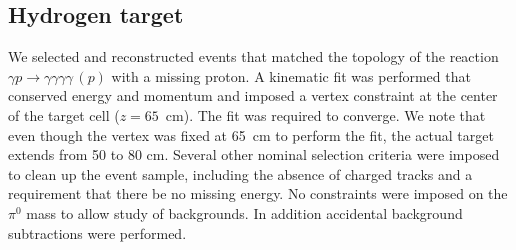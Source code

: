 \subsection{Hydrogen target}
  We selected and reconstructed events that matched the
topology of the reaction $\gamma p\rightarrow \gamma \gamma \gamma
\gamma\, (p)$ with a missing proton. A kinematic fit was performed
that conserved energy and momentum and imposed a vertex constraint at the center of the target cell
($z=65$~cm). The fit was required to converge. We note
that even though the vertex was
fixed at 65~cm to perform the fit, the actual target extends from 50
to 80 cm. Several other nominal selection criteria were imposed to clean up
the event sample, including the absence of charged tracks and a requirement
that there be no missing
energy. No constraints were imposed on the $\pi^0$ mass to allow study of
backgrounds. In addition accidental background subtractions were performed.
